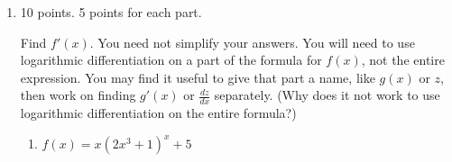 \documentclass{article}
\begin{document}
\begin{enumerate}[topsep=0pt]
\begin{enumerate}
    \begin{solution}
      We start with the given equation:
      \begin{align*}
        y &= \frac{xe^{5x}}{(3x+1)^2 \sqrt{x-2}} \\
        \intertext{Take the natural log of both sides and simplify the
          right side:}
        \ln y &= \ln \left( \frac{xe^{5x}}{(3x+1)^2 \sqrt{x-2}} \right) \\
        &= \ln \left( x e^{5x} \right) - \ln \left[ (3x+1)^2 \sqrt{x-2}
        \right] \\
        &= \ln x + \ln \left( e^{5x} \right) - \ln \left[ (3x + 1)^2
        \right] - \ln \sqrt{x - 2} \\
        &= \ln x + 5x - 2 \ln (3x + 1) - \frac{1}{2} \ln (x - 2)  \\
        \intertext{Differentiate both sides with respect to $x$:}
        \frac{1}{y} \frac{dy}{dx} &= \frac{1}{x} + 5 - \frac{2}{3x + 1}
        \cdot 3 - \frac{1}{2} \cdot \frac{1}{x - 2} \cdot 1 \\
        &= \frac{1}{x} + 5 - \frac{6}{3x + 1} - \frac{1}{2 (x - 2)} \\
        \shortintertext{Solve for $\frac{dy}{dx}$:} \frac{dy}{dx} &=
        \boxed{\frac{xe^{5x}}{(3x+1)^2 \sqrt{x-2}} \left( \frac{1}{x} + 5
            - \frac{6}{3x + 1} - \frac{1}{2 (x - 2)} \right)}
      \end{align*}
    \end{solution}
  \end{enumerate}





\item

\begin{grading}
10 points. 5 points for each part.
\end{grading}

Find $f'(x)$. You need not simplify your answers.  You will
  need to use logarithmic differentiation on a part of the formula for $f(x)$, not the entire expression.
  You may find it useful to give that part a name, like $g(x)$ or $z$,
  then work on finding $g'(x)$ or $\frac{dz}{dx}$ separately. (Why does it
  not work to use logarithmic differentiation on the entire formula?)
  \begin{enumerate}
  \item
    \begin{problem}[\vfill\newpage]
      $f(x) =x(2x^3 +1)^x +5$
    \end{problem}


\end{enumerate}
\end{enumerate}
\end{document}
